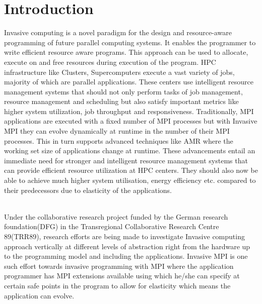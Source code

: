\documentclass{article}
\begin{document}
\section{Introduction}
Invasive computing is a novel paradigm for the design and resource-aware programming of future parallel computing systems. It enables the programmer to write efficient resource aware programs. This approach can be used to allocate, execute on and free resources during execution of the program. HPC infrastructure like Clusters, Supercomputers execute a vast variety of jobs, majority of which are parallel applications. These centers use intelligent resource management systems that should not only perform tasks of job management, resource management and scheduling but also satisfy important metrics like higher system utilization, job throughput and responsiveness. Traditionally, MPI applications are executed with a fixed number of MPI processes but with Invasive MPI they can evolve dynamically at runtime in the number of their MPI processes. This in turn supports advanced techniques like AMR where the working set size of applications change at runtime. These advancements entail an immediate need for stronger and intelligent resource management systems that can provide efficient resource utilization at HPC centers. They should also now be able to achieve much higher system utilisation, energy efficiency etc. compared to their predecessors due to elasticity of the applications.\par 
\noindent
\\Under the collaborative research project funded by the German research foundation(DFG) in the Transregional Collaborative Research Centre 89(TRR89), research efforts are being made to investigate Invasive computing approach vertically at different levels of abstraction right from the hardware up to the programming model and including the applications. Invasive MPI is one such effort towards invasive programming with MPI where the application programmer has MPI extensions available using which he/she can specify at certain safe points in the program to allow for elasticity which means the application can evolve.\par
 
\end{document}

